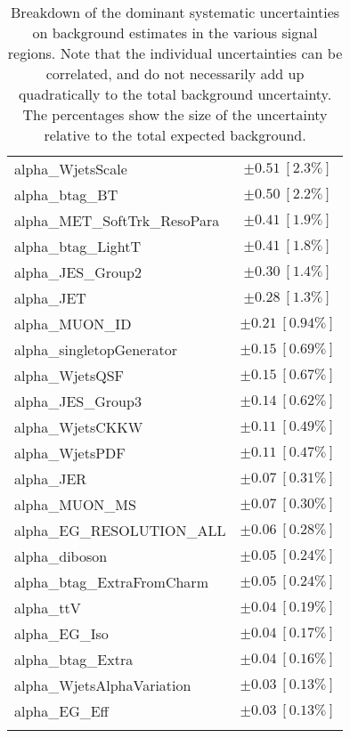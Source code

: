 \begin{table}
\begin{center}
\begin{tabular*}{\textwidth}{@{\extracolsep{\fill}}lc}
alpha\_WjetsScale         & $\pm 0.51\ [2.3\%] $       \\
alpha\_btag\_BT         & $\pm 0.50\ [2.2\%] $       \\
alpha\_MET\_SoftTrk\_ResoPara         & $\pm 0.41\ [1.9\%] $       \\
alpha\_btag\_LightT         & $\pm 0.41\ [1.8\%] $       \\
alpha\_JES\_Group2         & $\pm 0.30\ [1.4\%] $       \\
alpha\_JET         & $\pm 0.28\ [1.3\%] $       \\
alpha\_MUON\_ID         & $\pm 0.21\ [0.94\%] $       \\
alpha\_singletopGenerator         & $\pm 0.15\ [0.69\%] $       \\
alpha\_WjetsQSF         & $\pm 0.15\ [0.67\%] $       \\
alpha\_JES\_Group3         & $\pm 0.14\ [0.62\%] $       \\
alpha\_WjetsCKKW         & $\pm 0.11\ [0.49\%] $       \\
alpha\_WjetsPDF         & $\pm 0.11\ [0.47\%] $       \\
alpha\_JER         & $\pm 0.07\ [0.31\%] $       \\
alpha\_MUON\_MS         & $\pm 0.07\ [0.30\%] $       \\
alpha\_EG\_RESOLUTION\_ALL         & $\pm 0.06\ [0.28\%] $       \\
alpha\_diboson         & $\pm 0.05\ [0.24\%] $       \\
alpha\_btag\_ExtraFromCharm         & $\pm 0.05\ [0.24\%] $       \\
alpha\_ttV         & $\pm 0.04\ [0.19\%] $       \\
alpha\_EG\_Iso         & $\pm 0.04\ [0.17\%] $       \\
alpha\_btag\_Extra         & $\pm 0.04\ [0.16\%] $       \\
alpha\_WjetsAlphaVariation         & $\pm 0.03\ [0.13\%] $       \\
alpha\_EG\_Eff         & $\pm 0.03\ [0.13\%] $       \\
\noalign{\smallskip}\hline\noalign{\smallskip}
\end{tabular*}
\end{center}
\caption[Breakdown of uncertainty on background estimates]{
Breakdown of the dominant systematic uncertainties on background estimates in the various signal regions.
Note that the individual uncertainties can be correlated, and do not necessarily add up quadratically to 
the total background uncertainty. The percentages show the size of the uncertainty relative to the total expected background.
\label{table.results.bkgestimate.uncertainties.VRtt1offEM_cuts}}
\end{table}
%